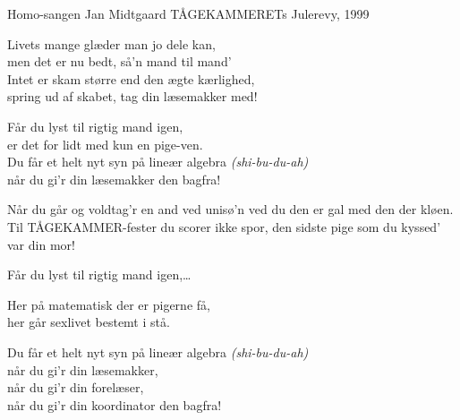 \begin{song}{Homo-sangen}
  {} %
  {\SBOrgMel} %
  {Jan Midtgaard} %
  {TÅGEKAMMERETs Julerevy, 1999} %
  {\NotCCLIed} %

  \begin{SBVerse}
    Livets mange glæder man jo dele kan,\\
    men det er nu bedt, så'n mand til mand'\\
    Intet er skam større end den ægte kærlighed,\\
    spring ud af skabet, tag din læsemakker med!
  \end{SBVerse}

  \begin{SBChorus}
    Får du lyst til rigtig mand igen,\\
    er det for lidt med kun en pige-ven.\\
    Du får et helt nyt syn på lineær algebra \emph{(shi-bu-du-ah)}\\
    når du gi’r din læsemakker den bagfra!
  \end{SBChorus}

  \begin{SBVerse}
    Når du går og voldtag’r en and ved unisø’n
    ved du den er gal med den der kløen.
    Til TÅGEKAMMER-fester du scorer ikke spor,
    den sidste pige som du kyssed’ var din mor!
  \end{SBVerse}

  \begin{SBChorus}
    Får du lyst til rigtig mand igen,\ldots
  \end{SBChorus}

  \begin{SBSection*}
  Her på matematisk der er pigerne få,\\
  her går sexlivet bestemt i stå.
  \end{SBSection*}

  \begin{SBChorus}
    Du får et helt nyt syn på lineær algebra \emph{(shi-bu-du-ah)}\\
    når du gi’r din læsemakker,\\
    når du gi'r din forelæser,\\
    når du gi'r din koordinator den bagfra!
  \end{SBChorus}
\end{song}